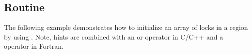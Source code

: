 \subsection{ Routine}
\label{subsec:init_lock_with_hint}

The following example demonstrates how to initialize an array of locks in a  region by using .
Note, hints are combined with an \bcode{|} or \bcode{+} operator in C/C++ and a \bcode{+} operator in Fortran.


